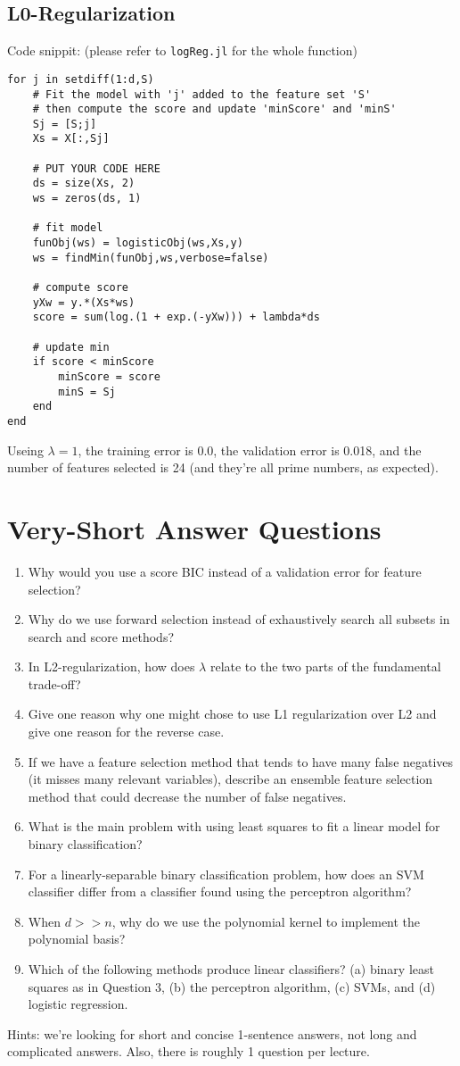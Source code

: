 \documentclass{article}
\def\enum#1{\begin{enumerate}#1\end{enumerate}}
\begin{document}
\subsection{L0-Regularization}

Code snippit: (please refer to \texttt{logReg.jl} for the whole function)
\begin{verbatim}
for j in setdiff(1:d,S)
    # Fit the model with 'j' added to the feature set 'S'
    # then compute the score and update 'minScore' and 'minS'
    Sj = [S;j]
    Xs = X[:,Sj]

    # PUT YOUR CODE HERE
    ds = size(Xs, 2)
    ws = zeros(ds, 1)

    # fit model
    funObj(ws) = logisticObj(ws,Xs,y)
    ws = findMin(funObj,ws,verbose=false)

    # compute score
    yXw = y.*(Xs*ws)
    score = sum(log.(1 + exp.(-yXw))) + lambda*ds

    # update min
    if score < minScore
        minScore = score
        minS = Sj
    end
end
\end{verbatim}

Useing $\lambda = 1$, the training error is 0.0, the validation error is 0.018, and the number of features selected is 24 (and they're all prime numbers, as expected).

\section{Very-Short Answer Questions}

\enum{
\item Why would you use a score BIC instead of a validation error for feature selection?
\item Why do we use forward selection instead of exhaustively search all subsets in search and score methods?
\item In L2-regularization, how does $\lambda$ relate to the two parts of the fundamental trade-off?
\item Give one reason why one might chose to use L1 regularization over L2 and give one reason for the reverse case.
\item If we have a feature selection method that tends to have many false negatives (it misses many relevant variables), describe an ensemble feature selection method that could decrease the number of false negatives.
\item What is the main problem with using least squares to fit a linear model for binary classification?
\item For a linearly-separable binary classification problem, how does an SVM classifier differ from a classifier found using the perceptron algorithm?
\item When $d >> n$, why do we use the polynomial kernel to implement the polynomial basis?
\item Which of the following methods produce linear classifiers? (a) binary least squares as in Question 3, (b) the perceptron algorithm, (c) SVMs, and (d) logistic regression.
}

Hints: we're looking for short and concise 1-sentence answers, not long and complicated answers. Also, there is roughly 1 question per lecture.
\end{document}
